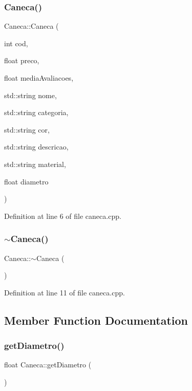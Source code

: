 \subsubsection{\texorpdfstring{Caneca()}{Caneca()}}
{\footnotesize\ttfamily Caneca\+::\+Caneca (\begin{DoxyParamCaption}\item[{int}]{cod,  }\item[{float}]{preco,  }\item[{float}]{media\+Avaliacoes,  }\item[{std\+::string}]{nome,  }\item[{std\+::string}]{categoria,  }\item[{std\+::string}]{cor,  }\item[{std\+::string}]{descricao,  }\item[{std\+::string}]{material,  }\item[{float}]{diametro }\end{DoxyParamCaption})}



Definition at line 6 of file caneca.\+cpp.

\mbox{\label{class_caneca_ac9225dbd6662bf26163020d0b612fb02}} 
\subsubsection{\texorpdfstring{$\sim$\+Caneca()}{~Caneca()}}
{\footnotesize\ttfamily Caneca\+::$\sim$\+Caneca (\begin{DoxyParamCaption}{ }\end{DoxyParamCaption})}



Definition at line 11 of file caneca.\+cpp.



\subsection{Member Function Documentation}
\mbox{\label{class_caneca_abc26fbf2dcf3a88a2b5c6bb867ecc3b2}} 
\subsubsection{\texorpdfstring{get\+Diametro()}{getDiametro()}}
{\footnotesize\ttfamily float Caneca\+::get\+Diametro (\begin{DoxyParamCaption}{ }\end{DoxyParamCaption})}



